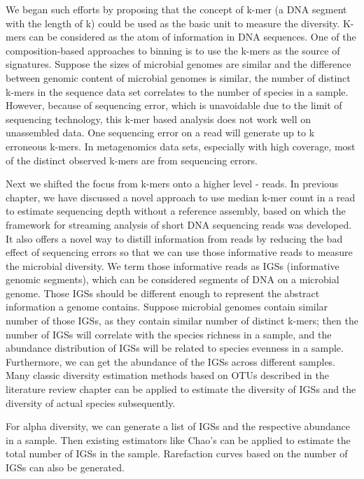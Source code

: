 We began such efforts by proposing that
 the concept of k-mer (a DNA segment with the length of k) could be used as the 
 basic unit to measure
the diversity. K-mers can be considered as the atom of information in DNA 
sequences. One of the composition-based approaches to binning is to use the 
k-mers as the source of signatures\cite{Alneberg2014, Imelfort2014}. Suppose the sizes of microbial genomes are similar and
 the difference between genomic content of microbial genomes is similar, the 
number of distinct k-mers in the sequence data set correlates to the number of 
species in a sample. However, because of sequencing error, which is unavoidable
 due to the limit of sequencing technology, this k-mer based analysis does not 
work well on unassembled data. One sequencing error on a read will generate up to k erroneous 
k-mers. In metagenomics data sets, especially with high coverage, most of the 
distinct observed k-mers are from sequencing errors.

Next we shifted the focus from k-mers onto a higher level - reads. 
In previous chapter, we have discussed a novel approach to use median k-mer 
count in a read to estimate
sequencing depth without a reference assembly, based on which the framework for
streaming analysis of short DNA sequencing reads was developed.
It also offers a novel way to distill information from reads by reducing the
 bad effect of sequencing errors so that we can use those informative reads to 
measure the microbial diversity. We term those informative reads as 
IGSs (informative genomic segments), which can be considered segments of DNA 
on a microbial genome. Those IGSs should be different enough to represent the 
abstract information a genome contains. Suppose microbial genomes contain 
similar number of those IGSs, as they contain similar number of distinct 
k-mers; then the number of IGSs will correlate with the species richness in a 
sample, and the abundance distribution of IGSs will be related to species 
evenness in a sample. Furthermore, we can get the abundance of the IGSs across
different samples. Many classic diversity estimation methods based on OTUs 
 described in the literature review chapter can be applied to estimate 
 the diversity of IGSs 
and the diversity of actual species subsequently.


For alpha diversity, we can generate a list of IGSs and the respective 
abundance in a sample. Then existing estimators like Chao's can be applied to 
estimate the total number of IGSs in the sample. Rarefaction curves based on the
number of IGSs can also be generated. 

